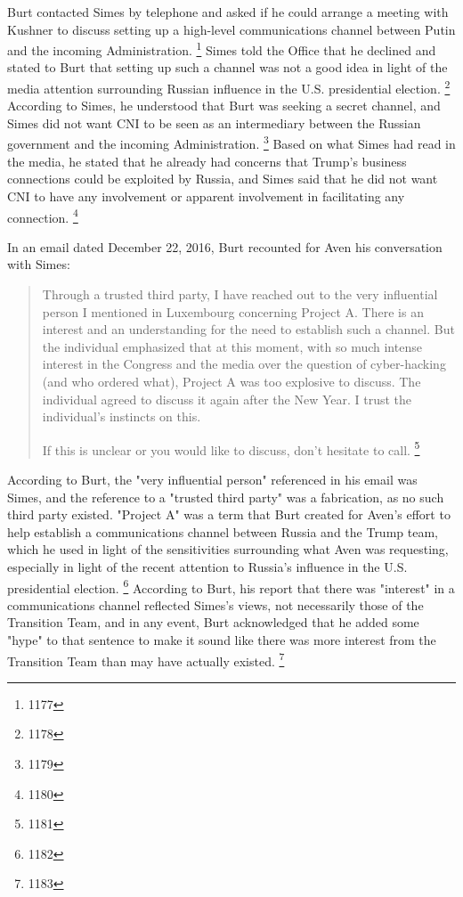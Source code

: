 Burt contacted Simes by telephone and asked if he could arrange a meeting with Kushner to discuss setting up a high-level communications channel between Putin and the incoming Administration.%
\footnote{1177}
Simes told the Office that he declined and stated to Burt that setting up such a channel was not a good idea in light of the media attention surrounding Russian influence in the U.S. presidential election.%
\footnote{1178}
According to Simes, he understood that Burt was seeking a secret channel, and Simes did not want CNI to be seen as an intermediary between the Russian government and the incoming Administration.%
\footnote{1179}
Based on what Simes had read in the media, he stated that he already had concerns that Trump's business connections could be exploited by Russia, and Simes said that he did not want CNI to have any involvement or apparent involvement in facilitating any connection.%
\footnote{1180}

In an email dated December 22, 2016, Burt recounted for Aven his conversation with Simes:

\begin{quote}
Through a trusted third party, I have reached out to the very influential person I mentioned in Luxembourg concerning Project A.
There is an interest and an understanding for the need to establish such a channel.
But the individual emphasized that at this moment, with so much intense interest in the Congress and the media over the question of cyber-hacking (and who ordered what), Project A was too explosive to discuss.
The individual agreed to discuss it again after the New Year.
I trust the individual's instincts on this.

If this is unclear or you would like to discuss, don't hesitate to call.%
\footnote{1181}
\end{quote}

According to Burt, the "very influential person" referenced in his email was Simes, and the reference to a "trusted third party" was a fabrication, as no such third party existed.
"Project A" was a term that Burt created for Aven's effort to help establish a communications channel between Russia and the Trump team, which he used in light of the sensitivities surrounding what Aven was requesting, especially in light of the recent attention to Russia's influence in the U.S. presidential election.%
\footnote{1182}
According to Burt, his report that there was "interest" in a communications channel reflected Simes's views, not necessarily those of the Transition Team, and in any event, Burt acknowledged that he added some "hype" to that sentence to make it sound like there was more interest from the Transition Team than may have actually existed.%
\footnote{1183}


